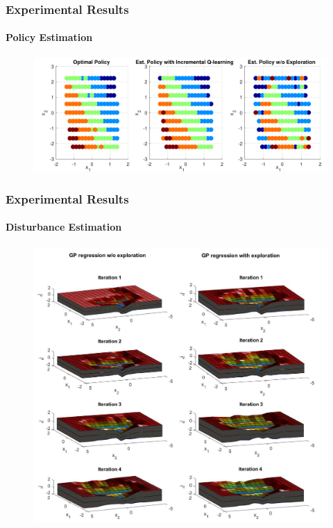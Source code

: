 \documentclass[t]{beamer}
\begin{document}
\begin{frame}
\frametitle{Experimental Results}
\framesubtitle{Policy Estimation}

\begin{figure}
\includegraphics[width=0.8\paperwidth]{Policy}
\end{figure}
\end{frame}

\begin{frame}
\frametitle{Experimental Results}
\framesubtitle{Disturbance Estimation}
\begin{figure}
\includegraphics[width=0.8\paperwidth]{GP}
\end{figure}
\end{frame}
\end{document}
